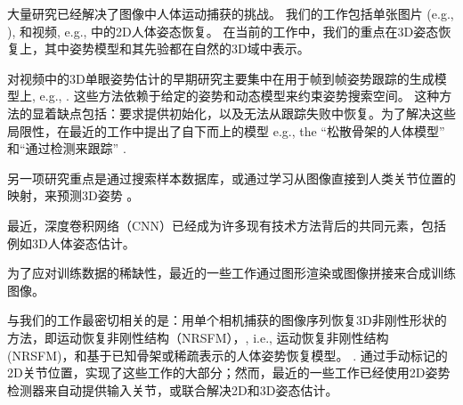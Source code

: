 
大量研究已经解决了图像中人体运动捕获的挑战\cite{moeslund2006survey,sminchisescu20073d,brubaker2010video,deva2011_Book,sarafianos20163d}。
我们的工作包括单张图片 (e.g., \cite{yang2011articulated,toshev2014deep,chen2014articulated,jain2014learning,tompson2014joint}), 和视频, e.g., \cite{sapp2011,cherian2014,nie2015joint,park2015articulated,pfister2015flowing,zhang2015human,newell2016stacked} 中的2D人体姿态恢复。
在当前的工作中，我们的重点在3D姿态恢复上，其中姿势模型和其先验都在自然的3D域中表示。

对视频中的3D单眼姿势估计的早期研究主要集中在用于帧到帧姿势跟踪的生成模型上, e.g.,  \cite{bregler1998tracking,sminchisescu2003kinematic}. 
这些方法依赖于给定的姿势和动态模型来约束姿势搜索空间。
这种方法的显着缺点包括：要求提供初始化，以及无法从跟踪失败中恢复。为了解决这些局限性，在最近的工作中提出了自下而上的模型 e.g., the ``松散骨架的人体模型'' \cite{sigal2012loose} 和``通过检测来跟踪'' \cite{andriluka2010monocular}.

另一项研究重点是通过搜索样本数据库\cite{shakhnarovich2003fast,mori2006recovering,jiang20103d,yasin2016dual}，或通过学习从图像直接到人类关节位置的映射，来预测3D姿势 \cite{agarwal2006recovering,bo2010twin,salzmann2010implicitly,yu2013unconstrained,ionescu2014human,kostrikov2014depth}。

最近，深度卷积网络（CNN）已经成为许多现有技术方法背后的共同元素，包括例如3D人体姿态估计\cite{li20143d,li2015maximum,tekin2015predicting,du2016marker,park20163d,zhou2016deep}。

为了应对训练数据的稀缺性，最近的一些工作通过图形渲染\cite{chen2016synthesizing}或图像拼接\cite{rogez2016mocap}来合成训练图像。 

与我们的工作最密切相关的是：用单个相机捕获的图像序列恢复3D非刚性形状的方法，即运动恢复非刚性结构（NRSFM），\cite{bregler2000recovering,akhter2011trajectory,dai2012simple,zhu2014complex,cho2015complex}, i.e., 运动恢复非刚性结构 (NRSFM)，和基于已知骨架\cite{lee1985determination,taylor2000reconstruction,valmadre2010deterministic,park20113d,radwan2013monocular,leonardos2016articulated}或稀疏表示的人体姿势恢复模型。 \cite{ramakrishna2012reconstructing,fan2014pose,akhter2015pose,zhou20153d,zhou2015sparse}. 通过手动标记的2D关节位置，实现了这些工作的大部分；然而，最近的一些工作已经使用2D姿势检测器来自动提供输入关节\cite{simo2012single,wang2014robust}，或联合解决2D和3D姿态估计\cite{simo2013joint,zhou2014spatio}。



